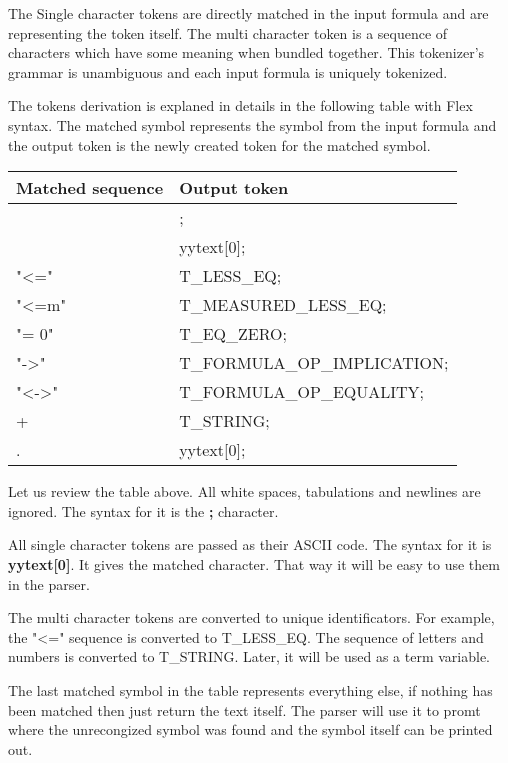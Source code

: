 \documentclass{article}
\begin{document}
	The Single character tokens are directly matched in the input formula and are representing the token itself.
	The multi character token is a sequence of characters which have some meaning when bundled together.
	This tokenizer's grammar is unambiguous and each input formula is uniquely tokenized.

	The tokens derivation is explaned in details in the following table with Flex syntax. The matched symbol represents the symbol from the input formula and the output token is the newly created token for the matched symbol.

		\begin{flushleft}
			\centering
			\begin{tabular}{ | m{10em} | m{15em}| } 
				\hline
					\textbf{Matched sequence} & \textbf{Output token} \\ [0.7ex] 
				\hline
					[ \textbackslash t\textbackslash  n] & ; \\
				\hline
					[,TF01()C\&|~*+-] 	& yytext[0];  \\
				\hline
				    "<="            &   T\_LESS\_EQ; \\
				\hline
				    "<=m"           &   T\_MEASURED\_LESS\_EQ; \\
				\hline
				    "= 0"           &   T\_EQ\_ZERO; \\
				\hline
				    "->"            &   T\_FORMULA\_OP\_IMPLICATION; \\
				\hline
				    "<->"           &   T\_FORMULA\_OP\_EQUALITY; \\
				\hline
				    [a-zA-Z0-9]+    &   T\_STRING; \\
				\hline
				    .               &   yytext[0]; \\
				\hline
			\end{tabular}
		\end{flushleft}
	Let us review the table above. All white spaces, tabulations and newlines are ignored. The syntax for it is the \textbf{;} character.

	All single character tokens are passed as their ASCII code. The syntax for it is \textbf{yytext[0]}. It gives the matched character. That way it will be easy to use them in the parser.

	The multi character tokens are converted to unique identificators. For example, the "<=" sequence is converted to T\_LESS\_EQ. The sequence of letters and numbers is converted to T\_STRING. Later, it will be used as a term variable.

	The last matched symbol in the table represents everything else, if nothing has been matched then just return the text itself.
	The parser will use it to promt where the unrecongized symbol was found and the symbol itself can be printed out.
\end{document}
